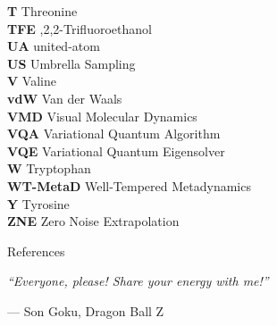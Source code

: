 \documentclass[12pt, twoside, openany]{book}
\makeatletter
\newcommand{\chapterquote}[2]{%
    \vfill
    \begin{flushright}
        \begin{minipage}{0.8\textwidth}
            \raggedleft
            {\setstretch{1.2}\large\textit{#1}\par}
            \vspace{0.4cm}
            {\normalsize #2\par}
        \end{minipage}
    \end{flushright}
    \vspace{1.5cm}
}
\renewcommand{\chapter}{%
    \clearpage
    \thispagestyle{plain} %
    \pagestyle{fancy} %
    \@afterindentfalse
    \secdef\@chapter\@schapter
}
\makeatother
\begin{document}
\begin{flushleft}
\begin{tabbing}
        \textbf{T} \> Threonine \\
        \textbf{TFE} ,2,2-Trifluoroethanol \\
        \textbf{UA} \> united-atom \\
        \textbf{US} \> Umbrella Sampling \\
        \textbf{V} \> Valine \\
        \textbf{vdW} \> Van der Waals \\
        \textbf{VMD} \> Visual Molecular Dynamics \\
        \textbf{VQA} \> Variational Quantum Algorithm \\
        \textbf{VQE} \> Variational Quantum Eigensolver \\
        \textbf{W} \> Tryptophan \\
        \textbf{WT-MetaD} \> Well-Tempered Metadynamics \\
        \textbf{Y} \> Tyrosine \\
        \textbf{ZNE} \> Zero Noise Extrapolation \\
    \end{tabbing}
\end{flushleft}






\clearpage
{}















\chapter{References}
\chapterquote{``Everyone, please! Share your energy with me!''}{--- Son Goku, Dragon Ball Z}
\newpage

\printbibliography[heading=none]



\label{LastPage}
\end{document}
